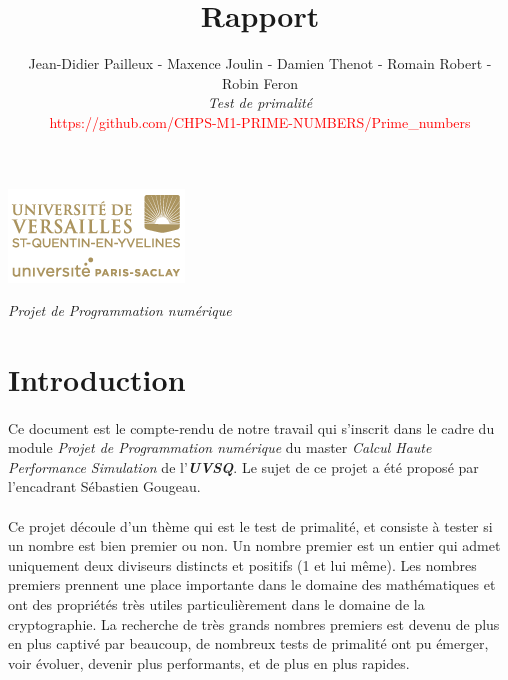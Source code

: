 

\title{\vspace{\fill}\textbf{\Huge Rapport}}
\author{Jean-Didier Pailleux - Maxence Joulin - Damien Thenot - Romain Robert - Robin Feron 
	\vspace{2em}\\
	\textit{Test de primalité}\\
	\textcolor{red}{https://github.com/CHPS-M1-PRIME-NUMBERS/Prime\_numbers}
	\vspace{2em}
}


\clearpage
\maketitle\vspace{13em}
\begin{center}\includegraphics[scale=0.7]{logo.png}\end{center}
\begin{flushright}\textit{Projet de Programmation numérique}\end{flushright}
\newpage
\tableofcontents
\newpage\clearpage{}

	\section{Introduction}
	\paragraph{}Ce document est le compte-rendu de notre travail qui s'inscrit dans le cadre du module \textit{Projet de Programmation numérique} du master \textit{Calcul Haute Performance Simulation} de l'\textit{\textbf{UVSQ}}. Le sujet de ce projet a été proposé par l'encadrant Sébastien Gougeau.
	
	\paragraph{}Ce projet découle d'un thème qui est le test de primalité, et consiste à tester si un nombre est bien premier ou non. Un nombre premier est un entier qui admet uniquement deux diviseurs distincts et positifs (1 et lui même). 
	Les nombres premiers prennent une place importante dans le domaine des mathématiques et ont des propriétés très utiles particulièrement dans le domaine de la cryptographie. La recherche de très grands nombres premiers est devenu de plus en plus captivé par beaucoup, de nombreux tests de primalité ont pu émerger, voir évoluer, devenir plus performants, et de plus en plus rapides.
	

